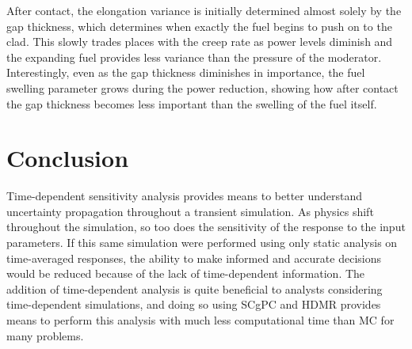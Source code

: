 After contact, the elongation variance is initially determined almost solely by the gap thickness, which determines
when exactly the fuel begins to push on to the clad.  This slowly trades places with the creep rate as power
levels diminish and the expanding fuel provides less variance than the pressure of the moderator.
Interestingly, even as the gap thickness diminishes in importance, the fuel swelling parameter grows during
the power reduction, showing how after contact the gap thickness becomes less important than the swelling of
the fuel itself.



\section{Conclusion}
Time-dependent sensitivity analysis provides means to better understand uncertainty propagation throughout a transient simulation.
As physics shift throughout the simulation, so too does the sensitivity of the response to the input parameters.  If this same
simulation were performed using only static analysis on time-averaged responses, the ability to make informed
and accurate decisions would be
reduced because of the lack of time-dependent information.  The addition of time-dependent analysis is quite beneficial to 
analysts considering time-dependent simulations, and doing so using SCgPC and HDMR provides means to perform
this analysis with much less computational time than MC for many problems.

